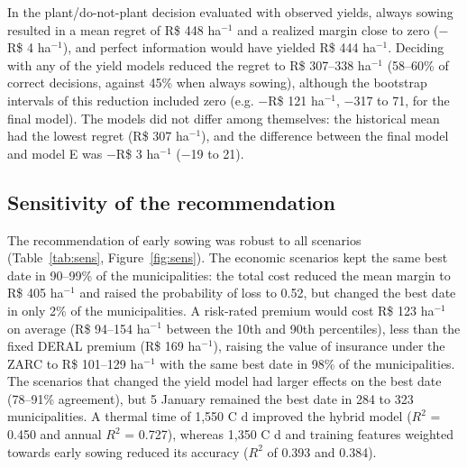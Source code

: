 \documentclass[10pt,a4paper]{article}
\begin{document}
In the plant/do-not-plant decision evaluated with observed yields, always sowing resulted in a mean
regret of R\$ 448 ha$^{-1}$ and a realized margin close to zero ($-$R\$ 4 ha$^{-1}$), and perfect
information would have yielded R\$ 444 ha$^{-1}$. Deciding with any of the yield models reduced the regret
to R\$ 307--338 ha$^{-1}$ (58--60\% of correct decisions, against 45\% when always sowing), although the
bootstrap intervals of this reduction included zero (e.g. $-$R\$ 121 ha$^{-1}$, $-$317 to 71, for the
final model). The models did not differ among themselves: the historical mean had the lowest regret
(R\$ 307 ha$^{-1}$), and the difference between the final model and model E was $-$R\$ 3 ha$^{-1}$
($-$19 to 21).

\subsection{Sensitivity of the recommendation}
\label{subsec:res_sens}

The recommendation of early sowing was robust to all scenarios (Table~\ref{tab:sens},
Figure~\ref{fig:sens}). The economic scenarios kept the same best date in 90--99\% of the municipalities:
the total cost reduced the mean margin to R\$ 405 ha$^{-1}$ and raised the probability of loss to 0.52,
but changed the best date in only 2\% of the municipalities. A risk-rated premium would cost R\$ 123
ha$^{-1}$ on average (R\$ 94--154 ha$^{-1}$ between the 10th and 90th percentiles), less than the fixed
DERAL premium (R\$ 169 ha$^{-1}$), raising the value of insurance under the ZARC to R\$ 101--129 ha$^{-1}$
with the same best date in 98\% of the municipalities. The scenarios that changed the yield model had
larger effects on the best date (78--91\% agreement), but 5 January remained the best date in 284 to 323
municipalities. A thermal time of 1,550 \textdegree{}C d improved the hybrid model ($R^2$ = 0.450 and annual
$R^2$ = 0.727), whereas 1,350 \textdegree{}C d and training features weighted towards early sowing
reduced its accuracy ($R^2$ of 0.393 and 0.384).
\end{document}
